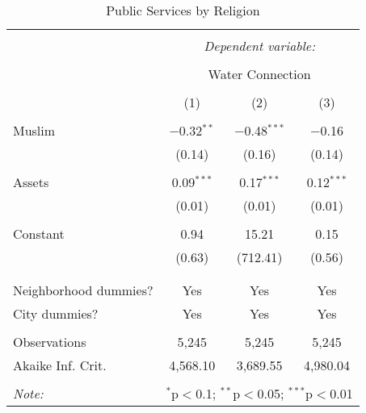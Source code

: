 
\begin{table}[!htbp] \centering 
  \caption{Public Services by Religion} 
  \label{table:Muslim_Services_1} 
\begin{tabular}{@{\extracolsep{5pt}}lccc} 
\\[-1.8ex]\hline 
\hline \\[-1.8ex] 
 & \multicolumn{3}{c}{\textit{Dependent variable:}} \\ 
\cline{2-4} 
\\[-1.8ex] & \multicolumn{3}{c}{Water Connection} \\ 
\\[-1.8ex] & (1) & (2) & (3)\\ 
\hline \\[-1.8ex] 
 Muslim & $-$0.32$^{**}$ & $-$0.48$^{***}$ & $-$0.16 \\ 
  & (0.14) & (0.16) & (0.14) \\ 
  & & & \\ 
 Assets & 0.09$^{***}$ & 0.17$^{***}$ & 0.12$^{***}$ \\ 
  & (0.01) & (0.01) & (0.01) \\ 
  & & & \\ 
 Constant & 0.94 & 15.21 & 0.15 \\ 
  & (0.63) & (712.41) & (0.56) \\ 
  & & & \\ 
\hline \\[-1.8ex] 
Neighborhood dummies? & Yes & Yes & Yes \\ 
City dummies? & Yes & Yes & Yes \\ 
\hline \\[-1.8ex] 
Observations & 5,245 & 5,245 & 5,245 \\ 
Akaike Inf. Crit. & 4,568.10 & 3,689.55 & 4,980.04 \\ 
\hline 
\hline \\[-1.8ex] 
\textit{Note:}  & \multicolumn{3}{r}{$^{*}$p$<$0.1; $^{**}$p$<$0.05; $^{***}$p$<$0.01} \\ 
\end{tabular} 
\end{table} 

